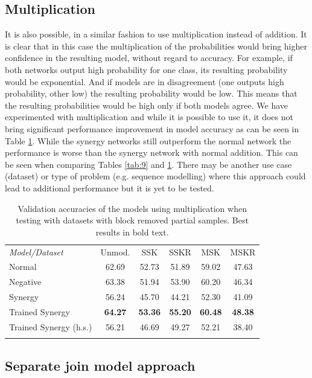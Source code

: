 \documentclass[b5paper]{book}
\begin{document}
\subsection{Multiplication}

It is also possible, in a similar fashion to use multiplication instead of addition. It is clear that in this case the multiplication of the probabilities would bring higher confidence in the resulting model, without regard to accuracy. For example, if both networks output high probability for one class, its resulting probability would be exponential. And if models are in disagreement (one outputs high probability, other low) the resulting probability would be low. This means that the resulting probabilities would be high only if both models agree. We have experimented with multiplication and while it is possible to use it, it does not bring significant performance improvement in model accuracy as can be seen in Table \ref{tab:10}. While the synergy networks still outperform the normal network the performance is worse than the synergy network with normal addition. This can be seen when comparing Tables \ref{tab:9} and \ref{tab:10}. There may be another use case (dataset) or type of problem (e.g. sequence modelling) where this approach could lead to additional performance but it is yet to be tested.

\begin{table}
\centering
\caption{Validation accuracies of the models using multiplication when testing with datasets with block removed partial samples. Best results in bold text.}
\label{tab:10}
\tabcolsep=0.06cm
\begin{tabular}{lccccc}
\hline\noalign{\smallskip}
\emph{Model/Dataset} & Unmod. & SSK & SSKR & MSK & MSKR \\
\noalign{\smallskip}\hline\noalign{\smallskip}
Normal & 62.69 & 52.73 & 51.89 & 59.02 & 47.63 \\
Negative & 63.38 & 51.94 & 53.90 & 60.20 & 46.34 \\
Synergy & 56.24 & 45.70 & 44.21 & 52.30 & 41.09 \\
Trained Synergy & \textbf{64.27} & \textbf{53.36} & \textbf{55.20} & \textbf{60.48} & \textbf{48.38} \\
Trained Synergy (h.s.) & 56.21 & 46.69 & 49.27 & 52.21 & 38.40 \\
\noalign{\smallskip}\hline
\end{tabular}
\end{table}

\subsection{Separate join model approach}
\end{document}
